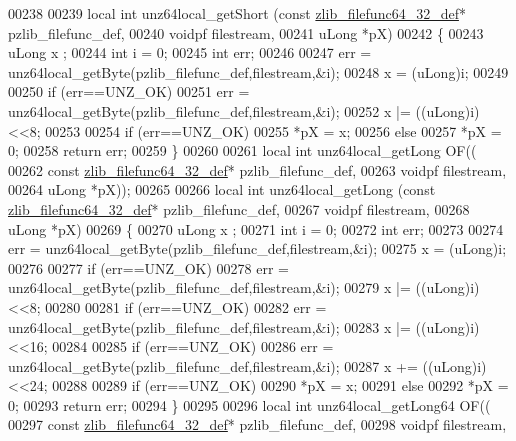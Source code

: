 \begin{DoxyCode}
00238 
00239 local \textcolor{keywordtype}{int} unz64local\_getShort (\textcolor{keyword}{const} \hyperlink{structzlib__filefunc64__32__def__s}{zlib\_filefunc64\_32\_def}* pzlib\_filefunc\_def,
00240                              voidpf filestream,
00241                              uLong *pX)
00242 \{
00243     uLong x ;
00244     \textcolor{keywordtype}{int} i = 0;
00245     \textcolor{keywordtype}{int} err;
00246 
00247     err = unz64local\_getByte(pzlib\_filefunc\_def,filestream,&i);
00248     x = (uLong)i;
00249 
00250     \textcolor{keywordflow}{if} (err==UNZ\_OK)
00251         err = unz64local\_getByte(pzlib\_filefunc\_def,filestream,&i);
00252     x |= ((uLong)i)<<8;
00253 
00254     \textcolor{keywordflow}{if} (err==UNZ\_OK)
00255         *pX = x;
00256     \textcolor{keywordflow}{else}
00257         *pX = 0;
00258     \textcolor{keywordflow}{return} err;
00259 \}
00260 
00261 local \textcolor{keywordtype}{int} unz64local\_getLong OF((
00262     \textcolor{keyword}{const} \hyperlink{structzlib__filefunc64__32__def__s}{zlib\_filefunc64\_32\_def}* pzlib\_filefunc\_def,
00263     voidpf filestream,
00264     uLong *pX));
00265 
00266 local \textcolor{keywordtype}{int} unz64local\_getLong (\textcolor{keyword}{const} \hyperlink{structzlib__filefunc64__32__def__s}{zlib\_filefunc64\_32\_def}* pzlib\_filefunc\_def,
00267                             voidpf filestream,
00268                             uLong *pX)
00269 \{
00270     uLong x ;
00271     \textcolor{keywordtype}{int} i = 0;
00272     \textcolor{keywordtype}{int} err;
00273 
00274     err = unz64local\_getByte(pzlib\_filefunc\_def,filestream,&i);
00275     x = (uLong)i;
00276 
00277     \textcolor{keywordflow}{if} (err==UNZ\_OK)
00278         err = unz64local\_getByte(pzlib\_filefunc\_def,filestream,&i);
00279     x |= ((uLong)i)<<8;
00280 
00281     \textcolor{keywordflow}{if} (err==UNZ\_OK)
00282         err = unz64local\_getByte(pzlib\_filefunc\_def,filestream,&i);
00283     x |= ((uLong)i)<<16;
00284 
00285     \textcolor{keywordflow}{if} (err==UNZ\_OK)
00286         err = unz64local\_getByte(pzlib\_filefunc\_def,filestream,&i);
00287     x += ((uLong)i)<<24;
00288 
00289     \textcolor{keywordflow}{if} (err==UNZ\_OK)
00290         *pX = x;
00291     \textcolor{keywordflow}{else}
00292         *pX = 0;
00293     \textcolor{keywordflow}{return} err;
00294 \}
00295 
00296 local \textcolor{keywordtype}{int} unz64local\_getLong64 OF((
00297     \textcolor{keyword}{const} \hyperlink{structzlib__filefunc64__32__def__s}{zlib\_filefunc64\_32\_def}* pzlib\_filefunc\_def,
00298     voidpf filestream,

\end{DoxyCode}
